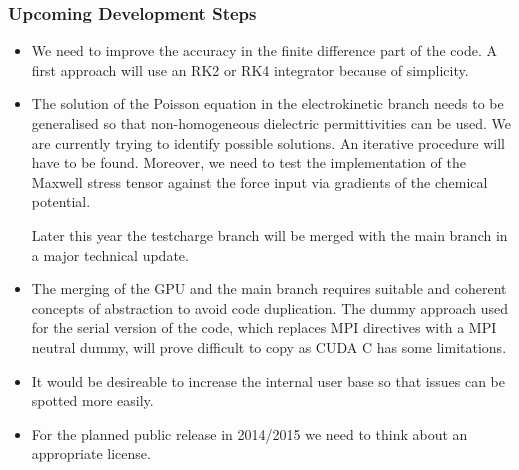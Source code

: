 \documentclass[11pt,twoside]{article}
\begin{document}
\subsubsection{Upcoming Development Steps}

\begin{itemize}
\item We need to improve the accuracy in the finite difference part of the code. 
A first approach will use an RK2 or RK4 integrator because of simplicity.

\item The solution of the Poisson equation in the electrokinetic branch needs to be generalised
so that non-homogeneous dielectric permittivities can be used. We are currently
trying to identify possible solutions. An iterative procedure will have to be
found. 
Moreover, we need to test the implementation of the Maxwell stress tensor against the 
force input via gradients of the chemical potential.

Later this year the testcharge branch will be merged with the main branch in a major
technical update.

\item The merging of the GPU and the main branch requires suitable and coherent concepts
of abstraction to avoid code duplication. The dummy approach used for the serial
version of the code, which replaces MPI directives with a MPI neutral dummy, will
prove difficult to copy as CUDA C has some limitations.

\item It would be desireable to increase the internal user base so that issues 
can be spotted more easily.

\item For the planned public release in 2014/2015 we need to think about an appropriate
license.

\end{itemize} 
\end{document}
